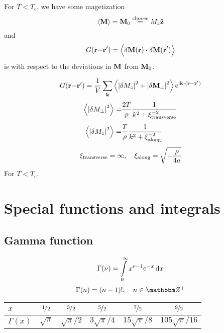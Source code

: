 \documentclass[11pt,letter, swedish, english, twocolumn
]{article}
\newcommand{\Tc}{\ensuremath{{T_{\text{c}}}}}
\begin{document}
For $T<\Tc$, we have some magetization
\begin{equation}
\ev{\vb{M}}=\vb{M}_0\stackrel{\text{choose}}{=}M_z\vu{z}
\end{equation}
and
\begin{equation}
G(\vb{r}{-}\vb{r}')=
\ev{\Big.\delta\vb{M}(\vb{r})\vdot\delta\vb{M}(\vb{r}')}
\end{equation}
is with respect to the deviations in $\vb{M}$ from $\vb{M}_0$.

\begin{equation}
G(\vb{r}{-}\vb{r}')=\frac{1}{V}\sum_{\vb{k}}
\ev{\abs{\delta{M}_z}^2 + \abs{\delta\vb{M}_\perp}^2}
\ee^{\ii \vb{k}\vdot(\vb{r}-\vb{r}')}
\end{equation}
\begin{equation}
\begin{aligned}
\ev{\abs{\delta{M}_\perp}^2}=&\frac{2T}{\rho}\frac{1}{k^2+\xi_\text{transverse}^{-2}}\\
\ev{\abs{\delta{M}_z}^2}=&\frac{T}{\rho}\frac{1}{k^2+\xi_\text{along}^{-2}}\Bigg.
\end{aligned}
\end{equation}
\begin{equation}
\xi_\text{transverse}=\infty\qcomma
\xi_\text{along}=\sqrt{-\frac{\rho}{4a}}
\end{equation}
For $T<\Tc$.


\clearpage
\appendix
\section{Special functions and integrals}
\subsection{Gamma function}
\begin{equation}
\Gamma(\nu)=\int_0^\infty x^{\nu-1}\ee^{-x}\id{x}
\end{equation}
\begin{equation}
\Gamma(n)=(n-1)!\qcomma n\in\Z^+
\end{equation}

\begin{center}
\begin{tabular}{|l||c|c|c|c|c|}\hline
$x$ & $\nicefrac{1}{2}$ & $\nicefrac{3}{2}$ & $\nicefrac{5}{2}$
& $\nicefrac{7}{2}$ & $\nicefrac{9}{2}$\\ \hline
$\Gamma(x)$ & $\sqrt{\pi}$ & $\sqrt{\pi}/2$ & $3\sqrt{\pi}/4$
& $15\sqrt{\pi}/8$ & $105\sqrt{\pi}/16$
\\ \hline
\end{tabular}
\end{center}
\end{document}
